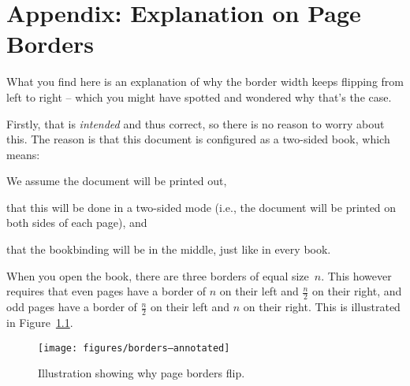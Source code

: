 \chapter{Appendix: Explanation on Page Borders}\label{chap:appendix2}

What you find here is an explanation of why the border width keeps flipping from left to right -- which you might have spotted and wondered why that's the case.

Firstly, that is \emph{intended} and thus correct, so there is no reason to worry about this. The reason is that this document is configured as a two-sided book, which means:
\begin{compactitem}
  \item We assume the document will be printed out,
  \item that this will be done in a two-sided mode (i.e., the document will be printed on both sides of each page), and
  \item that the bookbinding will be in the middle, just like in every book.
\end{compactitem}

When you open the book, there are three borders of equal size~$n$. This however requires that even pages have a border of $n$ on their left and $\frac{n}{2}$ on their right, and odd pages have a border of $\frac{n}{2}$ on their left and $n$ on their right. This is illustrated in Figure~\ref{fig:pageBorders}.

\begin{figure}[h]
  \texttt{[image: figures/borders--annotated]}
  \caption{Illustration showing why page borders flip.\label{fig:pageBorders}}
\end{figure}%

